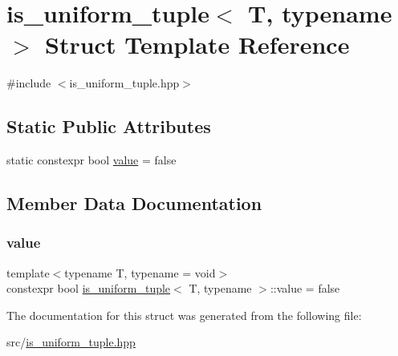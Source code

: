 \hypertarget{structis__uniform__tuple}{}\section{is\+\_\+uniform\+\_\+tuple$<$ T, typename $>$ Struct Template Reference}
\label{structis__uniform__tuple}


{\ttfamily \#include $<$is\+\_\+uniform\+\_\+tuple.\+hpp$>$}

\subsection*{Static Public Attributes}
\begin{DoxyCompactItemize}
\item 
static constexpr bool \hyperlink{structis__uniform__tuple_a3ba254c18d5af79286118c59003d529e}{value} = false
\end{DoxyCompactItemize}


\subsection{Member Data Documentation}
\mbox{\label{structis__uniform__tuple_a3ba254c18d5af79286118c59003d529e}} 
\subsubsection{\texorpdfstring{value}{value}}
{\footnotesize\ttfamily template$<$typename T, typename  = void$>$ \\
constexpr bool \hyperlink{structis__uniform__tuple}{is\+\_\+uniform\+\_\+tuple}$<$ T, typename $>$\+::value = false\hspace{0.3cm}{\ttfamily [static]}}



The documentation for this struct was generated from the following file\+:\begin{DoxyCompactItemize}
\item 
src/\hyperlink{is__uniform__tuple_8hpp}{is\+\_\+uniform\+\_\+tuple.\+hpp}\end{DoxyCompactItemize}
